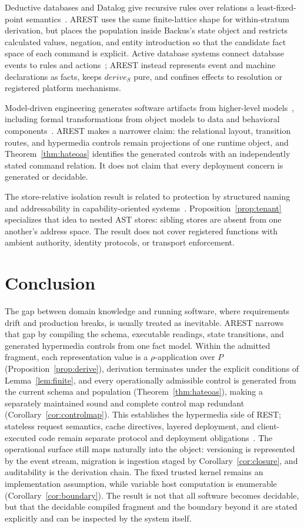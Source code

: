 \documentclass[10pt,twocolumn]{article}
\theoremstyle{plain}
\theoremstyle{definition}
\begin{document}
Deductive databases and Datalog give recursive rules over relations a least-fixed-point semantics~\cite{ceri89}. AREST uses the same finite-lattice shape for within-stratum derivation, but places the population inside Backus's state object and restricts calculated values, negation, and entity introduction so that the candidate fact space of each command is explicit. Active database systems connect database events to rules and actions~\cite{widom96}; AREST instead represents event and machine declarations as facts, keeps $\mathit{derive}_S$ pure, and confines effects to resolution or registered platform mechanisms.

Model-driven engineering generates software artifacts from higher-level models~\cite{schmidt06}, including formal transformations from object models to data and behavioral components~\cite{wang12}. AREST makes a narrower claim: the relational layout, transition routes, and hypermedia controls remain projections of one runtime object, and Theorem~\ref{thm:hateoas} identifies the generated controls with an independently stated command relation. It does not claim that every deployment concern is generated or decidable.

The store-relative isolation result is related to protection by structured naming and addressability in capability-oriented systems~\cite{dennis66}. Proposition~\ref{prop:tenant} specializes that idea to nested AST stores: sibling stores are absent from one another's address space. The result does not cover registered functions with ambient authority, identity protocols, or transport enforcement.

\section{Conclusion}

The gap between domain knowledge and running software, where requirements drift and production breaks, is usually treated as inevitable. AREST narrows that gap by compiling the schema, executable readings, state transitions, and generated hypermedia controls from one fact model. Within the admitted fragment, each representation value is a $\rho$-application over $P$ (Proposition~\ref{prop:derive}), derivation terminates under the explicit conditions of Lemma~\ref{lem:finite}, and every operationally admissible control is generated from the current schema and population (Theorem~\ref{thm:hateoas}), making a separately maintained sound and complete control map redundant (Corollary~\ref{cor:controlmap}). This establishes the hypermedia side of REST; stateless request semantics, cache directives, layered deployment, and client-executed code remain separate protocol and deployment obligations~\cite{fielding00}. The operational surface still maps naturally into the object: versioning is represented by the event stream, migration is ingestion staged by Corollary~\ref{cor:closure}, and auditability is the derivation chain. The fixed trusted kernel remains an implementation assumption, while variable host computation is enumerable (Corollary~\ref{cor:boundary}). The result is not that all software becomes decidable, but that the decidable compiled fragment and the boundary beyond it are stated explicitly and can be inspected by the system itself.
\end{document}
